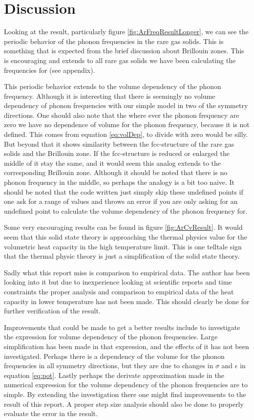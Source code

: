 \documentclass[11pt]{article}
\begin{document}
\section{Discussion}
Looking at the result, particularly figure \ref{fig:ArFreqResultLonger}, we can see the periodic behavior of the phonon frequencies in the rare gas solids. This is something that is expected from the brief discussion about Brillouin zones. This is encouraging and extends to all rare gas solids we have been calculating the frequencies for (see appendix). 

This periodic behavior extends to the volume dependency of the phonon frequency. Although it is interesting that there is seemingly no volume dependency of phonon frequencies with our simple model in two of the symmetry directions. One should also note that the where ever the phonon frequency are zero we have no dependence of volume for the phonon frequency, because it is not defined. This comes from equation \ref{eq:volDep}, to divide with zero would be silly. But beyond that it shows similarity between the fcc-structure of the rare gas solids and the Brillouin zone. If the fcc-structure is reduced or enlarged the middle of it stay the same, and it would seem this analog extends to the corresponding Brillouin zone. Although it should be noted that there is no phonon frequency in the middle, so perhaps the analogy is a bit too naive. It should be noted that the code written just simply skip these undefined points if one ask for a range of values and throws an error if you are only asking for an undefined point to calculate the volume dependency of the phonon frequency for. 

Some very encouraging results can be found in figure \ref{fig:ArCvResult}. It would seem that this solid state theory is approaching the thermal physics value for the volumetric heat capacity in the high temperature limit. This is one telltale sign that the thermal physic theory is just a simplification of the solid state theory. 

Sadly what this report miss is comparison to empirical data. The author has been looking into it but due to inexperience looking at scientific reports and time constraints the proper analysis and comparison to empirical data of the heat capacity in lower temperature has not been made. This should clearly be done for further verification of the result. 

Improvements that could be made to get a better results include to investigate the expression for volume dependency of the phonon frequencies. Large simplification has been made in that expression, and the effects of it has not been investigated. Perhaps there is a dependency of the volume for the phonon frequencies in all symmetry directions, but they are due to changes in $\sigma$ and $\epsilon$ in equation \ref{eq:pot}. Lastly perhaps the derivate approximation made in the numerical expression for the volume dependency of the phonon frequencies are to simple. By extending the investigation there one might find improvements to the result of this report. A proper step size analysis should also be done to properly evaluate the error in the result.
\end{document}
